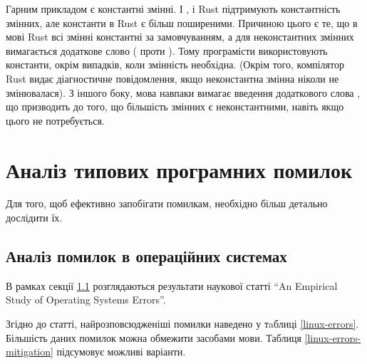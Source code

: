 \documentclass[main.tex]{subfiles}
\begin{document}
Гарним прикладом є константні змінні. І \LangC{}, і Rust підтримують константність змінних, але константи в Rust є більш поширеними. Причиною цього є те, що в мові Rust всі змінні константні за замовчуванням, а для неконстантних змінних вимагається додаткове слово ( проти ). Тому програмісти використовують константи, окрім випадків, коли змінність необхідна. (Окрім того, компілятор Rust видає діагностичне повідомлення, якщо неконстантна змінна ніколи не змінювалася). З іншого боку, мова \LangC{} навпаки вимагає введення додаткового слова , що призводить до того, що більшість змінних є неконстантними, навіть якщо цього не потребується.


\section{Аналіз типових програмних помилок}
Для того, щоб ефективно запобігати помилкам, необхідно більш детально дослідити їх.

\FloatBarrier
\subsection{Аналіз помилок в операційних системах}\label{errors:os}
В рамках секції \ref{errors:os} розглядаються результати наукової статті ``An Empirical Study of Operating Systems Errors''\cite{an-empirical-study-of-operating-systems-errors}.

Згідно до статті, найрозповсюдженіші помилки наведено у тaблиці \ref{linux-errors}.
Більшість даних помилок можна обмежити засобами мови. Таблиця \ref{linux-errors-mitigation} підсумовує можливі варіанти.
\end{document}
